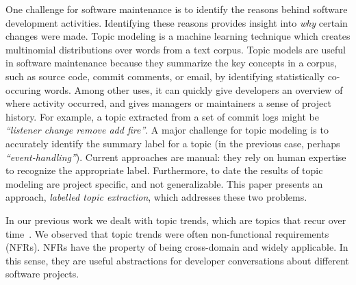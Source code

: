 \documentclass[]{sig-alternate}
\begin{document}



One challenge for software maintenance is to identify the reasons behind software development activities. Identifying these reasons provides insight into \emph{why} certain changes were made. Topic modeling is a machine learning technique which creates multinomial distributions over words from a text corpus. Topic models are useful in software maintenance because they summarize the key concepts in a corpus, such as source code, commit comments, or email, by identifying statistically co-occuring words. Among other uses, it can quickly give developers an overview of where activity occurred, and gives managers or maintainers a sense of project history. For example, a topic extracted from a set of commit logs might be \emph{ ``listener change remove add fire''}.  A major challenge for topic modeling is to accurately identify the summary label for a topic (in the previous case, perhaps \emph{``event-handling''}). 
Current approaches are manual: they rely on human expertise to recognize the appropriate label. Furthermore, to date the results of topic modeling are project specific, and not generalizable. This paper presents an approach, \emph{labelled topic extraction}, which addresses these two problems.


In our previous work we dealt with topic trends, which are topics that recur over time~\cite{Hindle09ICSM}. 
We observed that topic trends were often non-functional requirements (NFRs). 
NFRs have the property of being cross-domain and widely applicable. 
In this sense, they are useful abstractions for developer conversations about different software projects.
\end{document}
